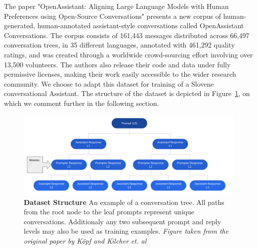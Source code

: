 \documentclass[fleqn,moreauthors,10pt]{ds_report}
\begin{document}
The paper "OpenAssistant: Aligning Large Language Models with Human Preferences using Open-Source Conversations" \cite{köpf2023openassistant} presents a new corpus of human-generated, human-annotated assistant-style conversations called OpenAssistant Conversations. The corpus consists of 161,443 messages distributed across 66,497 conversation trees, in 35 different languages, annotated with 461,292 quality ratings, and was created through a worldwide crowd-sourcing effort involving over 13,500 volunteers. The authors also release their code and data under fully permissive licenses, making their work easily accessible to the wider research community. We choose to adapt this dataset for training of a Slovene conversational Assistant. The structure of the dataset is depicted in Figure~\ref{fig:dataset}, on which we comment further in the following section.

\begin{figure}[ht]\centering
	\includegraphics[width=\linewidth]{fig/dataset.png}
	\caption{\textbf{Dataset Structure} An example of a conversation tree. All paths from the root node to the leaf prompts represent unique conversations. Additionaly any two subsequent prompt and reply levels may also be used as training examples. \textit{Figure taken from the original paper by Köpf and Kilcher et. al \cite{köpf2023openassistant}}}
	\label{fig:dataset}
\end{figure}

    
\end{document}

